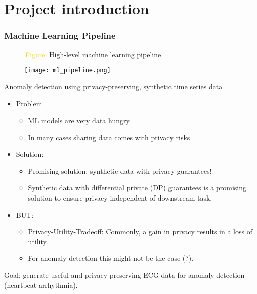 \section{Project introduction}

\begin{frame}
    \frametitle{Machine Learning Pipeline}
    ~~~~~~\textcolor{gold}{Figure: }High-level machine learning pipeline
    \begin{figure}[h]
        
        \centering
        \texttt{[image: ml\_pipeline.png]}
    \end{figure}
\end{frame}



\begin{frame}{Anomaly detection using privacy-preserving, synthetic time series data}
    
    \begin{itemize}
        \item Problem
        \begin{itemize}
            \item ML models are very \alert{data hungry}.
            \item In many cases sharing data comes with \alert{privacy risks}.
        \end{itemize}
        \item Solution:
        \begin{itemize}
            \item Promising solution: \alert{synthetic data} with privacy guarantees!
            \item Synthetic data with \alert{differential private} (DP) guarantees is a promising solution to ensure privacy independent of downstream task.
        \end{itemize}
        \item BUT:
        \begin{itemize}
            \item \alert{Privacy-Utility-Tradeoff}: Commonly, a gain in privacy results in a loss of utility. 
            \item For \alert{anomaly detection} this might not be the case (?).
        \end{itemize}
    \end{itemize}
    Goal: generate useful and privacy-preserving ECG data for anomaly detection (heartbeat arrhythmia).
\end{frame}


